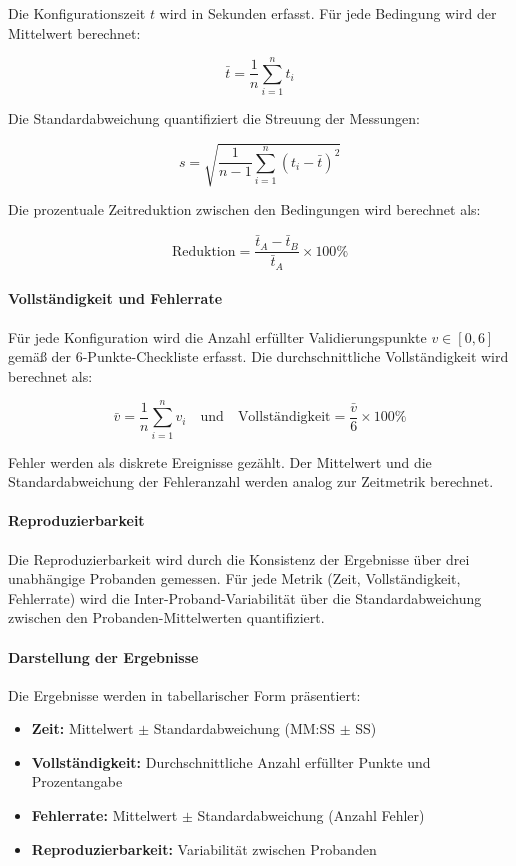 Die Konfigurationszeit $t$ wird in Sekunden erfasst. Für jede Bedingung wird der Mittelwert berechnet:

\[
\bar{t} = \frac{1}{n} \sum_{i=1}^{n} t_i
\]

Die Standardabweichung quantifiziert die Streuung der Messungen:

\[
s = \sqrt{\frac{1}{n-1} \sum_{i=1}^{n} (t_i - \bar{t})^2}
\]

Die prozentuale Zeitreduktion zwischen den Bedingungen wird berechnet als:

\[
\text{Reduktion} = \frac{\bar{t}_A - \bar{t}_B}{\bar{t}_A} \times 100\%
\]

\paragraph{Vollständigkeit und Fehlerrate}

Für jede Konfiguration wird die Anzahl erfüllter Validierungspunkte $v \in [0, 6]$ gemäß der 6-Punkte-Checkliste erfasst. Die durchschnittliche Vollständigkeit wird berechnet als:

\[
\bar{v} = \frac{1}{n} \sum_{i=1}^{n} v_i \quad \text{und} \quad \text{Vollständigkeit} = \frac{\bar{v}}{6} \times 100\%
\]

\noindent Fehler werden als diskrete Ereignisse gezählt. Der Mittelwert und die Standardabweichung der Fehleranzahl werden analog zur Zeitmetrik berechnet.

\paragraph{Reproduzierbarkeit}

Die Reproduzierbarkeit wird durch die Konsistenz der Ergebnisse über drei unabhängige Probanden gemessen. Für jede Metrik (Zeit, Vollständigkeit, Fehlerrate) wird die Inter-Proband-Variabilität über die Standardabweichung zwischen den Probanden-Mittelwerten quantifiziert.

\paragraph{Darstellung der Ergebnisse}

Die Ergebnisse werden in tabellarischer Form präsentiert:

\begin{itemize}
    \item \textbf{Zeit:} Mittelwert $\pm$ Standardabweichung (MM:SS $\pm$ SS)
    \item \textbf{Vollständigkeit:} Durchschnittliche Anzahl erfüllter Punkte und Prozentangabe
    \item \textbf{Fehlerrate:} Mittelwert $\pm$ Standardabweichung (Anzahl Fehler)
    \item \textbf{Reproduzierbarkeit:} Variabilität zwischen Probanden
\end{itemize}


